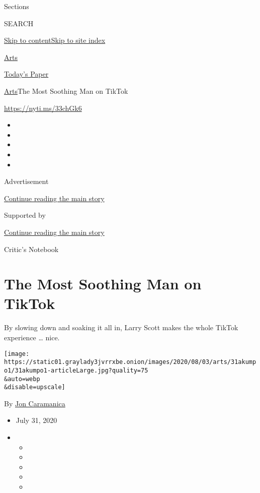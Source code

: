 Sections

SEARCH

\protect\hyperlink{site-content}{Skip to
content}\protect\hyperlink{site-index}{Skip to site index}

\href{https://www.nytimes3xbfgragh.onion/section/arts}{Arts}

\href{https://myaccount.nytimes3xbfgragh.onion/auth/login?response_type=cookie\&client_id=vi}{}

\href{https://www.nytimes3xbfgragh.onion/section/todayspaper}{Today's
Paper}

\href{/section/arts}{Arts}\textbar{}The Most Soothing Man on TikTok

\url{https://nyti.ms/33chGk6}

\begin{itemize}
\item
\item
\item
\item
\item
\end{itemize}

Advertisement

\protect\hyperlink{after-top}{Continue reading the main story}

Supported by

\protect\hyperlink{after-sponsor}{Continue reading the main story}

Critic's Notebook

\hypertarget{the-most-soothing-man-on-tiktok}{%
\section{The Most Soothing Man on
TikTok}\label{the-most-soothing-man-on-tiktok}}

By slowing down and soaking it all in, Larry Scott makes the whole
TikTok experience \ldots{} nice.

\texttt{[image: https://static01.graylady3jvrrxbe.onion/images/2020/08/03/arts/31akumpo1/31akumpo1-articleLarge.jpg?quality=75\\\&auto=webp\\\&disable=upscale]}

By \href{https://www.nytimes3xbfgragh.onion/by/jon-caramanica}{Jon
Caramanica}

\begin{itemize}
\item
  July 31, 2020
\item
  \begin{itemize}
  \item
  \item
  \item
  \item
  \item
  \end{itemize}
\end{itemize}

